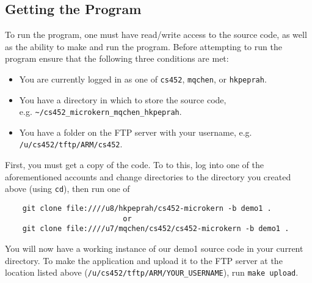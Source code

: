 \documentclass[12pt]{article}
\begin{document}
\subsection{Getting the Program}
To run the program, one must have read/write access to the source code, as well as the ability to make and run the program.  Before attempting to run the program ensure that the following three conditions are met:
\begin{itemize}
  \item You are currently logged in as one of \texttt{cs452}, \texttt{mqchen}, or \texttt{hkpeprah}.
  \item You have a directory in which to store the source code, \\ e.g. \texttt{\textasciitilde/cs452\_microkern\_mqchen\_hkpeprah}.
  \item You have a folder on the FTP server with your username, e.g. \texttt{/u/cs452/tftp/ARM/cs452}.
\end{itemize}
First, you must get a copy of the code.  To to this, log into one of the aforementioned accounts and change directories to the directory you created above (using \texttt{cd}), then run one of
\begin{center}
  \begin{verbatim}
    git clone file:////u8/hkpeprah/cs452-microkern -b demo1 .
                           or
    git clone file:////u7/mqchen/cs452/cs452-microkern -b demo1 .
  \end{verbatim}
\end{center}
\vspace{-0.5cm}You will now have a working instance of our demo1 source code in your current directory.  To make the application and upload it to the FTP server at the location listed above (\texttt{/u/cs452/tftp/ARM/YOUR\_USERNAME}), run \texttt{make upload}.
\\[1\baselineskip]
\end{document}
